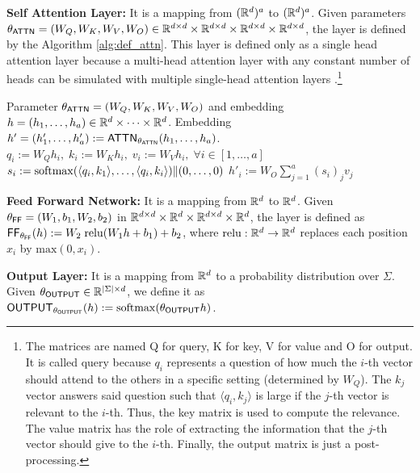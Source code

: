 \textbf{Self Attention Layer: } It is a mapping from $(\mathbb{R}^d)^a$ to $(\mathbb{R}^d)^a$.
Given parameters $\theta_{\mathsf{ATTN}} = (W_Q, W_K , W_V , W_O) \in \mathbb{R}^{d \times d} \times \mathbb{R}^{d \times d} \times \mathbb{R}^{d \times d} \times \mathbb{R}^{d \times d}$, the layer is defined by the Algorithm \ref{alg:def_attn}. 
This layer is defined only as a single head attention layer because a multi-head attention layer with any constant number of heads can be simulated with multiple single-head attention layers \citep{cookbook}.\footnote{The matrices are named Q for query, K for key, V for value and O for output.
It is called query because $q_i$ represents a question of how much the $i$-th vector should attend to the others in a specific setting (determined by $W_Q$).
The $k_j$ vector answers said question such that $\langle q_i, k_j \rangle$ is large if the $j$-th vector is relevant to the $i$-th.
Thus, the key matrix is used to compute the relevance.
The value matrix has the role of extracting the information that the $j$-th vector should give to the $i$-th.
Finally, the output matrix is just a post-processing.
}

\begin{algorithm}
\caption{Causal Self-Attention, $\ATTN$}\label{alg:def_attn}
\begin{algorithmic}[1]
\Input Parameter $\theta_{\mathsf{ATTN}} = (W_Q,W_K,W_V,W_O)$ and embedding $h= (h_1,\ldots, h_a)\in\mathbb{R}^d \times \dots \times \mathbb{R}^d$.
\Output Embedding $h'= (h'_1,\ldots, h'_a) := \mathsf{ATTN}_{\theta_{\mathsf{ATTN}}}(h_1,\ldots, h_a)$.
\State $q_i := W_Q  h_i, \; k_i := W_K h_i, \; v_i := W_V h_i, \; \forall i\in[1, \dots, a]$
\State $s_i := \mathrm{softmax} (\langle q_i, k_1 \rangle, \ldots, \langle q_i, k_i\rangle) \| (0,\ldots, 0) $
\State $h'_i := W_O \sum_{j=1}^a (s_i)_j v_j$
\end{algorithmic}
\end{algorithm}

\textbf{Feed Forward Network: } It is a mapping from $\mathbb{R}^d$ to $\mathbb{R}^d$. Given $\theta_{\mathsf{FF}} = (W_1 , b_1 , W_2 , b_2)$ in $\mathbb{R}^{d \times d} \times \mathbb{R}^d \times \mathbb{R}^{d \times d} \times \mathbb{R}^d$, the layer is defined as $\mathsf{FF}_{\theta_{\mathsf{FF}}}(h) := W_2 \; \mathrm{relu}(W_1 h + b_1 ) + b_2$, where $\mathrm{relu}: \mathbb{R}^d \to \mathbb{R}^d$ replaces each position $x_i$ by $\text{max}(0, x_i)$.


\textbf{Output Layer: } It is a mapping from $\mathbb{R}^d$ to a probability distribution over $\Sigma$.
Given $\theta_{\mathsf{OUTPUT}} \in \mathbb{R}^{| \Sigma | \times d}$, we define it as $\mathsf{OUTPUT}_{\theta_{\mathsf{OUTPUT}}}(h) := \mathrm{softmax}(\theta_{\mathsf{OUTPUT}} h)$.


